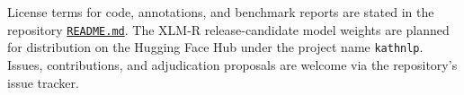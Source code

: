 \documentclass[11pt]{article}
\newcommand{\repobase}{https://github.com/gmikros/katharevousa-nlp-tooling}
\begin{document}
\noindent License terms for code, annotations, and benchmark reports are stated in the repository \href{\repobase/blob/main/README.md}{\texttt{README.md}}. The XLM-R release-candidate model weights are planned for distribution on the Hugging Face Hub under the project name \texttt{kathnlp}. Issues, contributions, and adjudication proposals are welcome via the repository's issue tracker.



\end{document}
